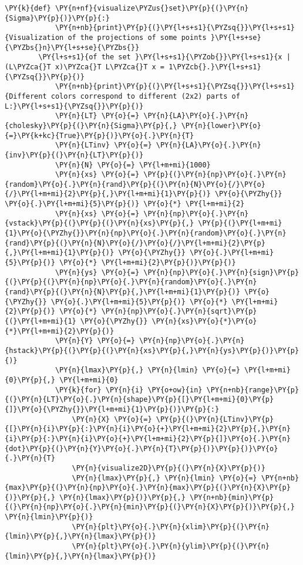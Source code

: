 \begin{Verbatim}[commandchars=\\\{\}]
        \PY{k}{def} \PY{n+nf}{visualize\PYZus{}set}\PY{p}{(}\PY{n}{Sigma}\PY{p}{)}\PY{p}{:}
            \PY{n+nb}{print}\PY{p}{(}\PY{l+s+s1}{\PYZsq{}}\PY{l+s+s1}{Visualization of the projections of some points }\PY{l+s+se}{\PYZbs{}n}\PY{l+s+se}{\PYZbs{}}
        \PY{l+s+s1}{of the set }\PY{l+s+s1}{\PYZob{}}\PY{l+s+s1}{x | (L\PYZca{}T x)\PYZca{}T L\PYZca{}T x = 1\PYZcb{}.}\PY{l+s+s1}{\PYZsq{}}\PY{p}{)}
            \PY{n+nb}{print}\PY{p}{(}\PY{l+s+s1}{\PYZsq{}}\PY{l+s+s1}{Different colors correspond to different (2x2) parts of L:}\PY{l+s+s1}{\PYZsq{}}\PY{p}{)}
            \PY{n}{LT} \PY{o}{=} \PY{n}{LA}\PY{o}{.}\PY{n}{cholesky}\PY{p}{(}\PY{n}{Sigma}\PY{p}{,} \PY{n}{lower}\PY{o}{=}\PY{k+kc}{True}\PY{p}{)}\PY{o}{.}\PY{n}{T}
            \PY{n}{LTinv} \PY{o}{=} \PY{n}{LA}\PY{o}{.}\PY{n}{inv}\PY{p}{(}\PY{n}{LT}\PY{p}{)}
            \PY{n}{N} \PY{o}{=} \PY{l+m+mi}{1000}
            \PY{n}{xs} \PY{o}{=} \PY{p}{(}\PY{n}{np}\PY{o}{.}\PY{n}{random}\PY{o}{.}\PY{n}{rand}\PY{p}{(}\PY{n}{N}\PY{o}{/}\PY{o}{/}\PY{l+m+mi}{2}\PY{p}{,}\PY{l+m+mi}{1}\PY{p}{)} \PY{o}{\PYZhy{}} \PY{o}{.}\PY{l+m+mi}{5}\PY{p}{)} \PY{o}{*} \PY{l+m+mi}{2}
            \PY{n}{xs} \PY{o}{=} \PY{n}{np}\PY{o}{.}\PY{n}{vstack}\PY{p}{(}\PY{p}{(}\PY{n}{xs}\PY{p}{,} \PY{p}{(}\PY{l+m+mi}{1}\PY{o}{\PYZhy{}}\PY{n}{np}\PY{o}{.}\PY{n}{random}\PY{o}{.}\PY{n}{rand}\PY{p}{(}\PY{n}{N}\PY{o}{/}\PY{o}{/}\PY{l+m+mi}{2}\PY{p}{,}\PY{l+m+mi}{1}\PY{p}{)} \PY{o}{\PYZhy{}} \PY{o}{.}\PY{l+m+mi}{5}\PY{p}{)} \PY{o}{*} \PY{l+m+mi}{2}\PY{p}{)}\PY{p}{)}
            \PY{n}{ys} \PY{o}{=} \PY{n}{np}\PY{o}{.}\PY{n}{sign}\PY{p}{(}\PY{p}{(}\PY{n}{np}\PY{o}{.}\PY{n}{random}\PY{o}{.}\PY{n}{rand}\PY{p}{(}\PY{n}{N}\PY{p}{,}\PY{l+m+mi}{1}\PY{p}{)} \PY{o}{\PYZhy{}} \PY{o}{.}\PY{l+m+mi}{5}\PY{p}{)} \PY{o}{*} \PY{l+m+mi}{2}\PY{p}{)} \PY{o}{*} \PY{n}{np}\PY{o}{.}\PY{n}{sqrt}\PY{p}{(}\PY{l+m+mi}{1} \PY{o}{\PYZhy{}} \PY{n}{xs}\PY{o}{*}\PY{o}{*}\PY{l+m+mi}{2}\PY{p}{)}
            \PY{n}{Y} \PY{o}{=} \PY{n}{np}\PY{o}{.}\PY{n}{hstack}\PY{p}{(}\PY{p}{(}\PY{n}{xs}\PY{p}{,}\PY{n}{ys}\PY{p}{)}\PY{p}{)}
            \PY{n}{lmax}\PY{p}{,} \PY{n}{lmin} \PY{o}{=} \PY{l+m+mi}{0}\PY{p}{,} \PY{l+m+mi}{0}
            \PY{k}{for} \PY{n}{i} \PY{o+ow}{in} \PY{n+nb}{range}\PY{p}{(}\PY{n}{LT}\PY{o}{.}\PY{n}{shape}\PY{p}{[}\PY{l+m+mi}{0}\PY{p}{]}\PY{o}{\PYZhy{}}\PY{l+m+mi}{1}\PY{p}{)}\PY{p}{:}
                \PY{n}{X} \PY{o}{=} \PY{p}{(}\PY{n}{LTinv}\PY{p}{[}\PY{n}{i}\PY{p}{:}\PY{n}{i}\PY{o}{+}\PY{l+m+mi}{2}\PY{p}{,}\PY{n}{i}\PY{p}{:}\PY{n}{i}\PY{o}{+}\PY{l+m+mi}{2}\PY{p}{]}\PY{o}{.}\PY{n}{dot}\PY{p}{(}\PY{n}{Y}\PY{o}{.}\PY{n}{T}\PY{p}{)}\PY{p}{)}\PY{o}{.}\PY{n}{T}
                \PY{n}{visualize2D}\PY{p}{(}\PY{n}{X}\PY{p}{)}
                \PY{n}{lmax}\PY{p}{,} \PY{n}{lmin} \PY{o}{=} \PY{n+nb}{max}\PY{p}{(}\PY{n}{np}\PY{o}{.}\PY{n}{max}\PY{p}{(}\PY{n}{X}\PY{p}{)}\PY{p}{,} \PY{n}{lmax}\PY{p}{)}\PY{p}{,} \PY{n+nb}{min}\PY{p}{(}\PY{n}{np}\PY{o}{.}\PY{n}{min}\PY{p}{(}\PY{n}{X}\PY{p}{)}\PY{p}{,} \PY{n}{lmin}\PY{p}{)}
                \PY{n}{plt}\PY{o}{.}\PY{n}{xlim}\PY{p}{(}\PY{n}{lmin}\PY{p}{,}\PY{n}{lmax}\PY{p}{)}
                \PY{n}{plt}\PY{o}{.}\PY{n}{ylim}\PY{p}{(}\PY{n}{lmin}\PY{p}{,}\PY{n}{lmax}\PY{p}{)}
            

\end{Verbatim}
